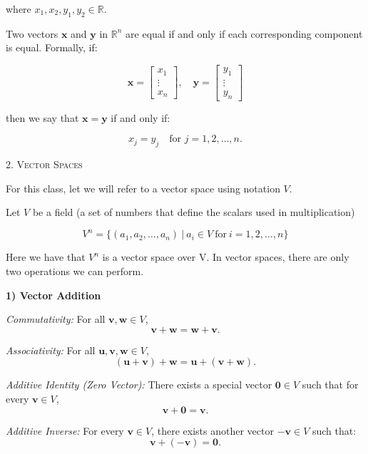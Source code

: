 \documentclass{article}
\begin{document}
where \( x_1, x_2, y_1, y_2 \in \mathbb{R} \).

\medskip 
Two vectors \( \mathbf{x} \) and \( \mathbf{y} \) in \( \mathbb{R}^n \) are equal if and only if each corresponding component is equal. Formally, if:

\[
\mathbf{x} =
\begin{bmatrix}
x_1 \\
\vdots \\
x_n
\end{bmatrix}, \quad
\mathbf{y} =
\begin{bmatrix}
y_1 \\
\vdots \\
y_n
\end{bmatrix}
\]

then we say that \( \mathbf{x} = \mathbf{y} \) if and only if:

\[
x_j = y_j \quad \text{for } j = 1, 2, \dots, n.
\]

\medskip
\begin{center}
    \textsc{2. Vector Spaces}
\end{center}

For this class, let we will refer to a vector space using notation $V$. 

\medskip
Let $V$ be a field (a set of numbers that define the scalars used in multiplication)

\[V^n = \{(a_1,a_2,\dots,a_n)\ |\ a_i \in V \ \text{for}\ i=1,2,\dots,n\}\]

Here we have that $V^n$ is a vector space over V. In vector spaces, there are only two operations we can perform. 


\medskip
\noindent \textbf{1) Vector Addition} 

\medskip
\emph{Commutativity:} For all \( \mathbf{v}, \mathbf{w} \in V \),
\[
\mathbf{v} + \mathbf{w} = \mathbf{w} + \mathbf{v}.
\]

\emph{Associativity:} For all \( \mathbf{u}, \mathbf{v}, \mathbf{w} \in V \),
\[
(\mathbf{u} + \mathbf{v}) + \mathbf{w} = \mathbf{u} + (\mathbf{v} + \mathbf{w}).
\]

\emph{Additive Identity (Zero Vector):} There exists a special vector \( \mathbf{0} \in V \) such that for every \( \mathbf{v} \in V \),
\[
\mathbf{v} + \mathbf{0} = \mathbf{v}.
\]

\emph{Additive Inverse:} For every \( \mathbf{v} \in V \), there exists another vector \( -\mathbf{v} \in V \) such that:
\[
\mathbf{v} + (-\mathbf{v}) = \mathbf{0}.
\]
\end{document}
